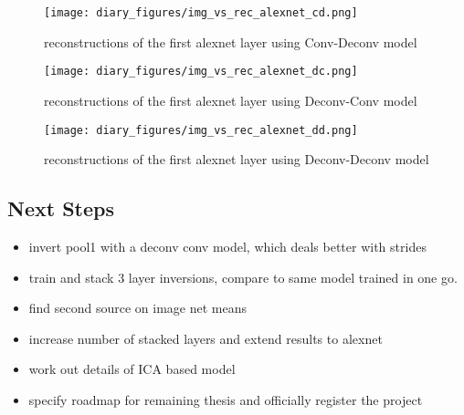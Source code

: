 \documentclass{article}
\begin{document}
\begin{figure}
    \centering
    \texttt{[image: diary\_figures/img\_vs\_rec\_alexnet\_cd.png]}
    \caption{reconstructions of the first alexnet layer using Conv-Deconv model}
    \label{fig:alex_cd}
\end{figure}


\begin{figure}
    \centering
    \texttt{[image: diary\_figures/img\_vs\_rec\_alexnet\_dc.png]}
    \caption{reconstructions of the first alexnet layer using Deconv-Conv model}
    \label{fig:alex_dc}
\end{figure}

\begin{figure}
    \centering
    \texttt{[image: diary\_figures/img\_vs\_rec\_alexnet\_dd.png]}
    \caption{reconstructions of the first alexnet layer using Deconv-Deconv model}
    \label{fig:alex_dd}
\end{figure}

\FloatBarrier
\subsection*{Next Steps}
\begin{itemize}
    \item invert pool1 with a deconv conv model, which deals better with strides
    \item train and stack 3 layer inversions, compare to same model trained in one go.
    \item find second source on image net means
    \item increase number of stacked layers and extend results to alexnet
    \item work out details of ICA based model
    \item specify roadmap for remaining thesis and officially register the project
\end{itemize}
\end{document}
